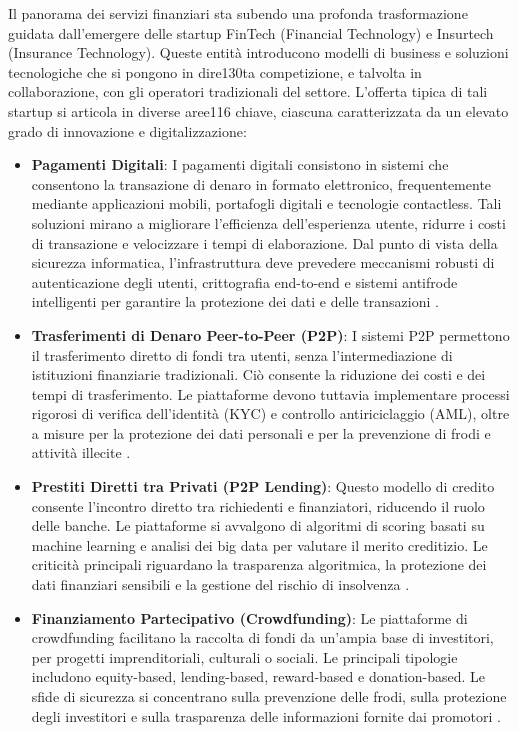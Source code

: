 Il panorama dei servizi finanziari sta subendo una profonda trasformazione guidata dall'emergere delle startup FinTech (Financial Technology) e Insurtech (Insurance Technology). Queste entità introducono modelli di business e soluzioni tecnologiche che si pongono in dire130ta competizione, e talvolta in collaborazione, con gli operatori tradizionali del settore. L'offerta tipica di tali startup si articola in diverse aree116 chiave, ciascuna caratterizzata da un elevato grado di innovazione e digitalizzazione:

\begin{itemize}
    \item \textbf{Pagamenti Digitali}: I pagamenti digitali consistono in sistemi che consentono la transazione di denaro in formato elettronico, frequentemente mediante applicazioni mobili, portafogli digitali e tecnologie contactless. Tali soluzioni mirano a migliorare l'efficienza dell’esperienza utente, ridurre i costi di transazione e velocizzare i tempi di elaborazione. Dal punto di vista della sicurezza informatica, l’infrastruttura deve prevedere meccanismi robusti di autenticazione degli utenti, crittografia end-to-end e sistemi antifrode intelligenti per garantire la protezione dei dati e delle transazioni \cite{zhang2020digital}.
    
    \item \textbf{Trasferimenti di Denaro Peer-to-Peer (P2P)}: I sistemi P2P permettono il trasferimento diretto di fondi tra utenti, senza l’intermediazione di istituzioni finanziarie tradizionali. Ciò consente la riduzione dei costi e dei tempi di trasferimento. Le piattaforme devono tuttavia implementare processi rigorosi di verifica dell’identità (KYC) e controllo antiriciclaggio (AML), oltre a misure per la protezione dei dati personali e per la prevenzione di frodi e attività illecite \cite{zhang2020digital}.
    
    \item \textbf{Prestiti Diretti tra Privati (P2P Lending)}: Questo modello di credito consente l’incontro diretto tra richiedenti e finanziatori, riducendo il ruolo delle banche. Le piattaforme si avvalgono di algoritmi di scoring basati su machine learning e analisi dei big data per valutare il merito creditizio. Le criticità principali riguardano la trasparenza algoritmica, la protezione dei dati finanziari sensibili e la gestione del rischio di insolvenza \cite{milne2016p2p}.
    
    \item \textbf{Finanziamento Partecipativo (Crowdfunding)}: Le piattaforme di crowdfunding facilitano la raccolta di fondi da un’ampia base di investitori, per progetti imprenditoriali, culturali o sociali. Le principali tipologie includono equity-based, lending-based, reward-based e donation-based. Le sfide di sicurezza si concentrano sulla prevenzione delle frodi, sulla protezione degli investitori e sulla trasparenza delle informazioni fornite dai promotori \cite{hornuf2018crowdfunding}.
    

\end{itemize}
